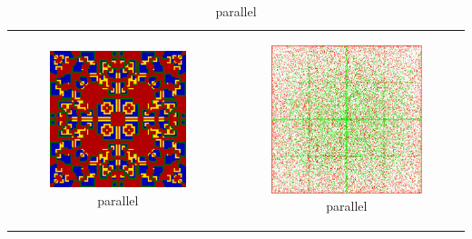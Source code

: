 \begin{table}
\begin{tabular}{c c}
		
		\begin{subfigure}[b]{0.4\textwidth}
			\centering
			\includegraphics[width=.7\textwidth, angle=0]{./fig/par_99x99_436steps_MSG_haskell.png}
			\caption{parallel}
			\label{fig:pd_par}
		\end{subfigure}
    	&
		\begin{subfigure}[b]{0.4\textwidth}
			\centering
			\includegraphics[width=.7\textwidth, angle=0]{./fig/par_HAC_100_000_500steps_java.png}
			\caption{parallel}
			\label{fig:hac_par}
		\end{subfigure}
    	\\
    	
		

\end{tabular}
\end{table}
